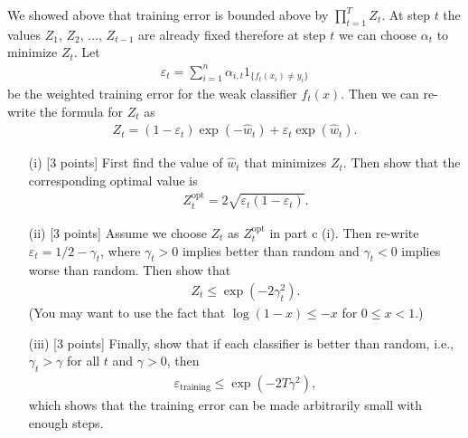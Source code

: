\item {}  We showed above that training error is bounded above by $\prod_{t=1}^T Z_t$. At step $t$ the values $Z_1$, $Z_2$, $\ldots$, $Z_{t-1}$ are already fixed therefore at step $t$ we can choose $\alpha_t$ to minimize $Z_t$. Let
		\begin{align*}
			\varepsilon_t 
			= \sum_{i=1}^n \alpha_{i, t} 1_{\{f_t(x_i) \neq y_i\}}
		\end{align*}
	be the weighted training error for the weak classifier $f_t(x)$. Then we can re-write the formula for $Z_t$ as
	\begin{align*}
		Z_t = (1-\varepsilon_t) \exp(-\hat{w}_t) + \varepsilon_t \exp(\hat{w}_t).
	\end{align*}
 \begin{enumerate}
 	\item [(i)] [3 points] First find the value of  $\hat{w}_t$ that minimizes $Z_t$. Then show that the corresponding optimal value is
	\begin{align*}
		Z^{\text{opt}}_t
		= 2 \sqrt{\varepsilon_t (1-\varepsilon_t)}.
	\end{align*}
	\item [(ii)] [3 points] Assume we choose $Z_t$ as $Z^{\text{opt}}_t$ in part c (i). Then re-write $\varepsilon_t = 1/2 - \gamma_t$, where $\gamma_t > 0$ implies better than random and $\gamma_t < 0$ implies worse than random. Then show that
	\begin{align*}
		Z_t \le \exp(-2 \gamma_t^2).
	\end{align*}
	(You may want to use the fact that $\log(1 - x) \le  -x$ for $0 \le  x < 1$.)
	\item [(iii)] [3 points] Finally, show that if each classifier is better than random, i.e.,  $\gamma_t > \gamma$ for all $t$ and $\gamma > 0$, then
	\begin{align*}
			\varepsilon_{\text{training}}
		\le \exp(-2T \gamma^2),
	\end{align*}
	which shows that the training error can be made arbitrarily small with enough steps.
 \end{enumerate}